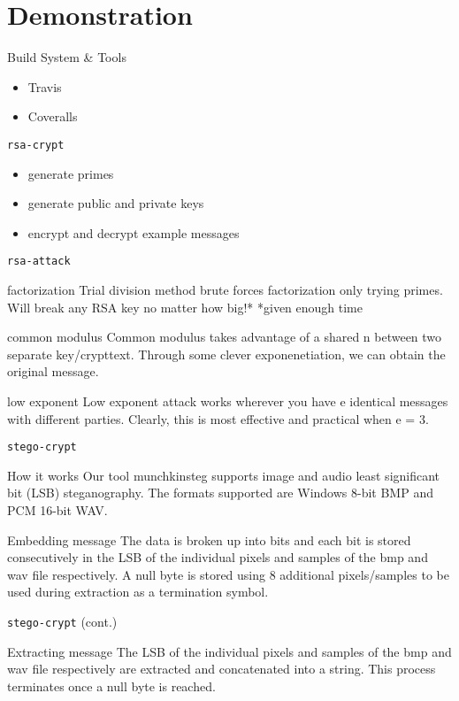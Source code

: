 \documentclass[presentation]{beamer}
\begin{document}
\section{Demonstration}
\label{sec:orgheadline1}
\begin{frame}[label=sec-3-1]{Build System \& Tools}
\begin{itemize}
\item Travis
\item Coveralls
\end{itemize}
\end{frame}
\begin{frame}[fragile,label=sec-3-2]{\texttt{rsa-crypt}}
 \begin{itemize}
\item generate primes
\item generate public and private keys
\item encrypt and decrypt example messages
\end{itemize}
\end{frame}
\begin{frame}[fragile,label=sec-3-3]{\texttt{rsa-attack}}
 \begin{block}{factorization}
Trial division method brute forces factorization only trying primes. 
Will break any RSA key no matter how big!*
*given enough time
\end{block}
\begin{block}{common modulus}
Common modulus takes advantage of a shared n between two separate key/crypttext. 
Through some clever exponenetiation, we can obtain the original message.
\end{block}
\begin{block}{low exponent}
Low exponent attack works wherever you have e identical messages with different parties. 
Clearly, this is most effective and practical when e = 3.
\end{block}
\end{frame}
\begin{frame}[fragile,label=sec-3-4]{\texttt{stego-crypt}}
 \begin{block}{How it works}
Our tool munchkinsteg supports image and audio least significant bit (LSB)
steganography. The formats supported are Windows 8-bit BMP and PCM 16-bit WAV.
\end{block}
\begin{block}{Embedding message}
The data is broken up into bits and each bit is stored consecutively in the LSB
of the individual pixels and samples of the bmp and wav file respectively. A
null byte is stored using 8 additional pixels/samples to be used during
extraction as a termination symbol.
\end{block}
\end{frame}
\begin{frame}[fragile,label=sec-3-5]{\texttt{stego-crypt} (cont.)}
 \begin{block}{Extracting message}
The LSB of the individual pixels and samples of the bmp and wav file
respectively are extracted and concatenated into a string. This process
terminates once a null byte is reached.
\end{block}
\end{frame}
\end{document}

